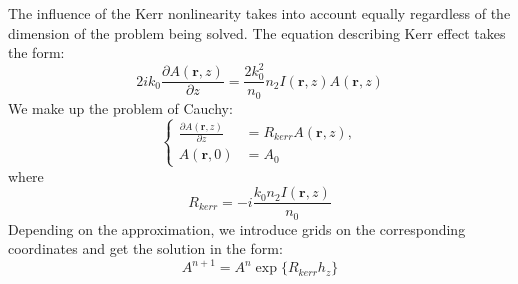 \documentclass[a4paper, 12pt]{article}
\begin{document}
The influence of the Kerr nonlinearity takes into account equally regardless of the dimension of the problem being solved. The equation describing Kerr effect takes the form:
\begin{equation}
2 i k_0  \frac{\partial A(\mathbf{r},z) }{\partial z} = \frac{2 k_0^2}{n_0} n_2 I(\mathbf{r},z) A(\mathbf{r},z)
\end{equation}
We make up the problem of Cauchy:
\begin{equation}
\label{eqn:diffraction_xy_cauchy}
\left\{
\begin{aligned}
 \frac{\partial A(\mathbf{r},z) }{\partial z} &= R_{kerr} A(\mathbf{r},z),\\
A(\mathbf{r}, 0) &= A_0
\end{aligned}
\right.
\end{equation}
where
\begin{equation}
R_{kerr} = -i\frac{k_0 n_2 I(\mathbf{r},z)}{n_0}
\end{equation}
Depending on the approximation, we introduce grids on the corresponding coordinates and get the solution in the form:
\begin{equation}
A^{n+1} = A^n \exp\{R_{kerr} h_z \}
\end{equation}
\end{document}
